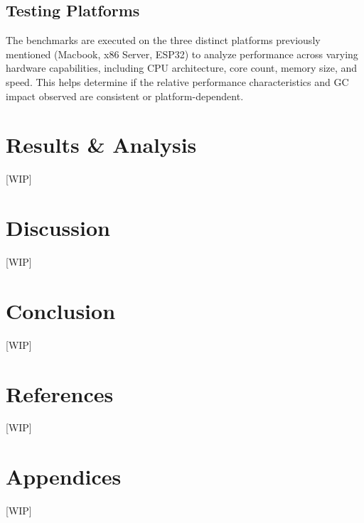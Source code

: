 \documentclass{article}
\begin{document}
\subsection{Testing Platforms} %

The benchmarks are executed on the three distinct platforms previously mentioned (Macbook, x86 Server, ESP32) to analyze performance across varying hardware capabilities, including CPU architecture, core count, memory size, and speed. This helps determine if the relative performance characteristics and GC impact observed are consistent or platform-dependent.





\section{Results \& Analysis}
[WIP] %

\section{Discussion}
[WIP] %

\section{Conclusion}
[WIP] %

\section{References}
[WIP] %

\section{Appendices}
[WIP] %
\end{document}
